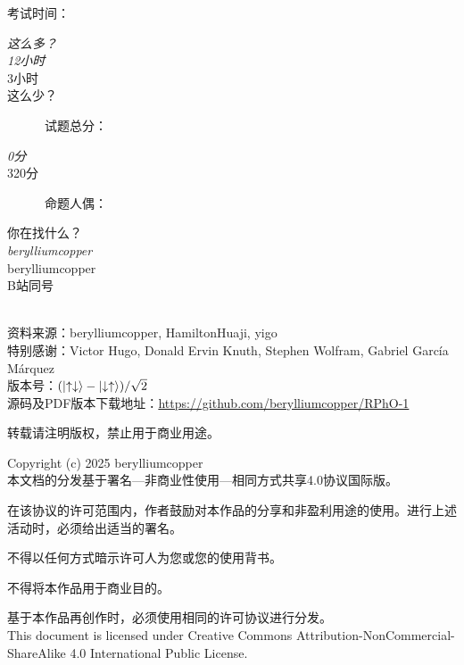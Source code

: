 \documentclass[10pt,a4paper,onecolumn,UTF8]{ctexart}
\begin{document}
	{\normalfont 考试时间：\begin{minipage}{10ex}\textit{\color{white}这么多？}\\{\textit{12小时}\\3小时\\{\color{white}这么少？}}\end{minipage}\,\,\,\,\,\,\,\,\,\,\,\,\,\,\,\,\,\,试题总分：\begin{minipage}{8ex}{\textit{0分}\\320分}\end{minipage}\,\,\,\,\,\,\,\,\,\,\,\,\,\,\,\,\,\,命题人{\color{white}偶}：\begin{minipage}{20ex}{\color{white}你在找什么？}\\{\textit{berylliumcopper}\\berylliumcopper}\\{\color{white}B站同号}\end{minipage}\\[1ex]
		
		资料来源：berylliumcopper, HamiltonHuaji, yigo\\[1ex]
		
		特别感谢：Victor Hugo, Donald Ervin Knuth, Stephen Wolfram, Gabriel García Márquez\\[1ex]
		
		版本号：$(\ket{\uparrow\downarrow}-\ket{\downarrow\uparrow})/\sqrt{2}$\\[1ex]
		
		源码及PDF版本下载地址：\href{https://github.com/berylliumcopper/RPhO-1}{https://github.com/berylliumcopper/RPhO-1}
		
		转载请注明版权，禁止用于商业用途。}
	
	\newpage
	\thispagestyle{empty}
	
	Copyright (c) 2025 berylliumcopper\\[5ex]
	
	本文档的分发基于署名—非商业性使用—相同方式共享4.0协议国际版。
	
	在该协议的许可范围内，作者鼓励对本作品的分享和非盈利用途的使用。进行上述活动时，必须给出适当的署名。
	
	不得以任何方式暗示许可人为您或您的使用背书。
	
	不得将本作品用于商业目的。
	
	基于本作品再创作时，必须使用相同的许可协议进行分发。\\[5ex]
	
	This document is licensed under Creative Commons Attribution-NonCommercial-ShareAlike 4.0 International Public License. 
	
\end{document}
